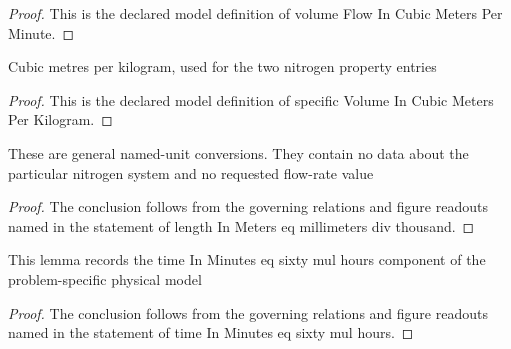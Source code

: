 \begin{proof}
  This is the declared model definition of volume Flow In Cubic Meters Per Minute.
\end{proof}
\begin{definition}
  \label{def:physics:phyx-mini-0445:phyxminiproblems-problemphyxmini0445-specificvolumeincubicmetersperkilogram}
  Cubic metres per kilogram, used for the two nitrogen property entries
\end{definition}
\begin{proof}
  This is the declared model definition of specific Volume In Cubic Meters Per Kilogram.
\end{proof}
\begin{lemma}
  \label{lem:physics:phyx-mini-0445:phyxminiproblems-problemphyxmini0445-lengthinmeters-eq-millimeters-div-thousand}
  These are general named-unit conversions. They contain no data about the particular nitrogen system and no requested flow-rate value
\end{lemma}
\begin{proof}
  The conclusion follows from the governing relations and figure readouts named in the statement of length In Meters eq millimeters div thousand.
\end{proof}
\begin{lemma}
  \label{lem:physics:phyx-mini-0445:phyxminiproblems-problemphyxmini0445-timeinminutes-eq-sixty-mul-hours}
  This lemma records the time In Minutes eq sixty mul hours component of the problem-specific physical model
\end{lemma}
\begin{proof}
  The conclusion follows from the governing relations and figure readouts named in the statement of time In Minutes eq sixty mul hours.
\end{proof}
